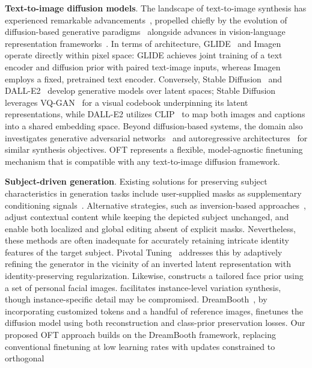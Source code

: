 \textbf{Text-to-image diffusion models}. The landscape of text-to-image synthesis has experienced remarkable advancements~\cite{saharia2022photorealistic,ramesh2022hierarchical,rombach2022high,gu2022vector,nichol2022glide}, propelled chiefly by the evolution of diffusion-based generative paradigms~\cite{ho2020denoising,song2021score,song2021denoising,dhariwal2021diffusion} alongside advances in vision-language representation frameworks~\cite{su2020vlbert,lu2019vilbert,radford2021learning,wang2021simvlm,li2022blip,li2023blip,alayrac2022flamingo,schuhmann2022laion}. In terms of architecture, GLIDE~\cite{nichol2022glide} and Imagen~\cite{saharia2022photorealistic} operate directly within pixel space: GLIDE achieves joint training of a text encoder and diffusion prior with paired text-image inputs, whereas Imagen employs a fixed, pretrained text encoder. Conversely, Stable Diffusion~\cite{rombach2022high} and DALL-E2~\cite{ramesh2022hierarchical} develop generative models over latent spaces; Stable Diffusion leverages VQ-GAN~\cite{esser2021taming} for a visual codebook underpinning its latent representations, while DALL-E2 utilizes CLIP~\cite{radford2021learning} to map both images and captions into a shared embedding space. Beyond diffusion-based systems, the domain also investigates generative adversarial networks~\cite{reed2016generative,zhang2017stackgan,xu2018attngan,li2019controllable} and autoregressive architectures~\cite{ramesh2021zero,ding2021cogview,wu2022nuwa,yuscaling} for similar synthesis objectives. OFT represents a flexible, model-agnostic finetuning mechanism that is compatible with any text-to-image diffusion framework.

\textbf{Subject-driven generation}. Existing solutions for preserving subject characteristics in generation tasks include user-supplied masks as supplementary conditioning signals~\cite{avrahami2022blended,nichol2022glide}. Alternative strategies, such as inversion-based approaches~\cite{choi2021ilvr,dhariwal2021diffusion,ramesh2022hierarchical,gal2022image}, adjust contextual content while keeping the depicted subject unchanged, and \cite{hertz2022prompt} enable both localized and global editing absent of explicit masks. Nevertheless, these methods are often inadequate for accurately retaining intricate identity features of the target subject. Pivotal Tuning~\cite{roich2022pivotal} addresses this by adaptively refining the generator in the vicinity of an inverted latent representation with identity-preserving regularization. Likewise, \cite{nitzan2022mystyle} constructs a tailored face prior using a set of personal facial images. \cite{casanova2021instance} facilitates instance-level variation synthesis, though instance-specific detail may be compromised. DreamBooth~\cite{ruiz2023dreambooth}, by incorporating customized tokens and a handful of reference images, finetunes the diffusion model using both reconstruction and class-prior preservation losses. Our proposed OFT approach builds on the DreamBooth framework, replacing conventional finetuning at low learning rates with updates constrained to orthogonal

